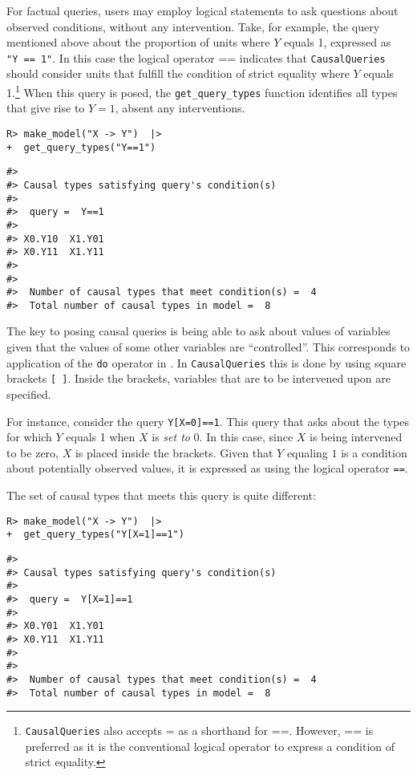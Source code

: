 \documentclass[
  11pt,
  article]{jss}
\begin{document}
For factual queries, users may employ logical statements to ask
questions about observed conditions, without any intervention. Take, for
example, the query mentioned above about the proportion of units where
\(Y\) equals 1, expressed as \texttt{"Y\ ==\ 1"}. In this case the
logical operator == indicates that \texttt{CausalQueries} should
consider units that fulfill the condition of strict equality where \(Y\)
equals 1.\footnote{\texttt{CausalQueries} also accepts = as a shorthand
  for ==. However, == is preferred as it is the conventional logical
  operator to express a condition of strict equality.} When this query
is posed, the \texttt{get\_query\_types} function identifies all types
that give rise to \(Y=1\), absent any interventions.

\begin{verbatim}
R> make_model("X -> Y")  |>
+  get_query_types("Y==1")
\end{verbatim}

\begin{verbatim}
#> 
#> Causal types satisfying query's condition(s)  
#> 
#>  query =  Y==1 
#> 
#> X0.Y10  X1.Y01
#> X0.Y11  X1.Y11
#> 
#> 
#>  Number of causal types that meet condition(s) =  4
#>  Total number of causal types in model =  8
\end{verbatim}

The key to posing causal queries is being able to ask about values of
variables given that the values of some other variables are
``controlled''. This corresponds to application of the \texttt{do}
operator in \citet{pearl_causality_2009}. In \texttt{CausalQueries} this
is done by using square brackets \texttt{{[}\ {]}}. Inside the brackets,
variables that are to be intervened upon are specified.

For instance, consider the query \texttt{Y{[}X=0{]}==1}. This query that
asks about the types for which \(Y\) equals 1 when \(X\) is \emph{set
to} 0. In this case, since \(X\) is being intervened to be zero, \(X\)
is placed inside the brackets. Given that \(Y\) equaling \(1\) is a
condition about potentially observed values, it is expressed as using
the logical operator \texttt{==}.

The set of causal types that meets this query is quite different:

\begin{verbatim}
R> make_model("X -> Y")  |>
+  get_query_types("Y[X=1]==1")
\end{verbatim}

\begin{verbatim}
#> 
#> Causal types satisfying query's condition(s)  
#> 
#>  query =  Y[X=1]==1 
#> 
#> X0.Y01  X1.Y01
#> X0.Y11  X1.Y11
#> 
#> 
#>  Number of causal types that meet condition(s) =  4
#>  Total number of causal types in model =  8
\end{verbatim}
\end{document}
